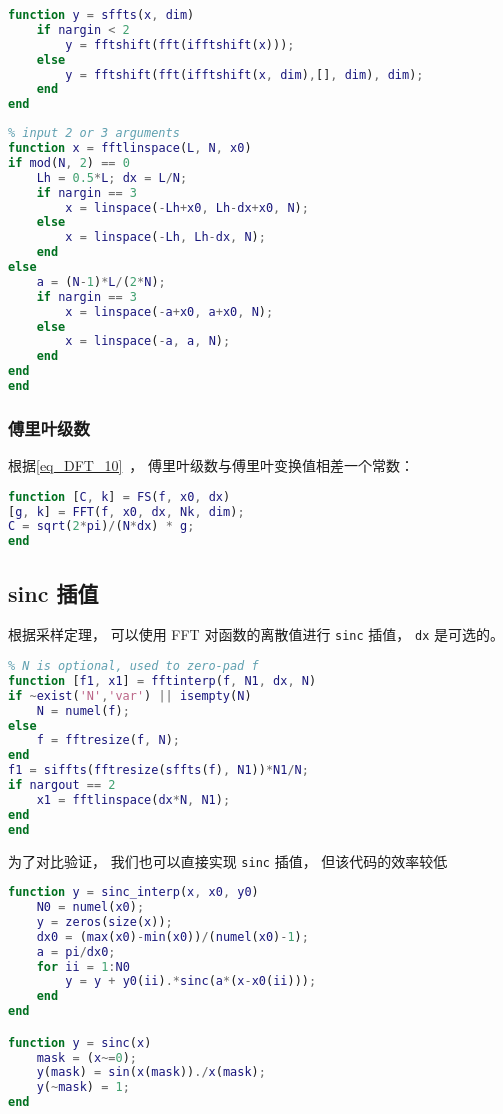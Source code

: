 \begin{lstlisting}[language=matlab, caption=sffts.m]
% shifted fft
function y = sffts(x, dim)
    if nargin < 2
        y = fftshift(fft(ifftshift(x)));
    else
        y = fftshift(fft(ifftshift(x, dim),[], dim), dim);
    end
end
\end{lstlisting}

\begin{lstlisting}[language=matlab, caption=fftlinspace.m]
% generate N grid points from bandwidth
% input 2 or 3 arguments
function x = fftlinspace(L, N, x0)
if mod(N, 2) == 0
    Lh = 0.5*L; dx = L/N;
    if nargin == 3
        x = linspace(-Lh+x0, Lh-dx+x0, N);
    else
        x = linspace(-Lh, Lh-dx, N);
    end
else
    a = (N-1)*L/(2*N);
    if nargin == 3
        x = linspace(-a+x0, a+x0, N);
    else
        x = linspace(-a, a, N);
    end
end
end
\end{lstlisting}

\subsubsection{傅里叶级数}
根据\autoref{eq_DFT_10}~， 傅里叶级数与傅里叶变换值相差一个常数：
\begin{lstlisting}[language=matlab, caption=FS.m]
% Fourier series by FFT
function [C, k] = FS(f, x0, dx)
[g, k] = FFT(f, x0, dx, Nk, dim);
C = sqrt(2*pi)/(N*dx) * g;
end
\end{lstlisting}

\subsection{sinc 插值}
根据采样定理， 可以使用 FFT 对函数的离散值进行 \verb|sinc| 插值， \verb|dx| 是可选的。
\begin{lstlisting}[language=matlab, caption=fftinterp.m]
% approximate sinc interpolation by fft
% N is optional, used to zero-pad f
function [f1, x1] = fftinterp(f, N1, dx, N)
if ~exist('N','var') || isempty(N)
    N = numel(f);
else
    f = fftresize(f, N);
end
f1 = siffts(fftresize(sffts(f), N1))*N1/N;
if nargout == 2
    x1 = fftlinspace(dx*N, N1);
end
end
\end{lstlisting}

为了对比验证， 我们也可以直接实现 \verb|sinc| 插值， 但该代码的效率较低
\begin{lstlisting}[language=matlab, caption=sinc\_interp.m]
% sinc_interp
function y = sinc_interp(x, x0, y0)
    N0 = numel(x0);
    y = zeros(size(x));
    dx0 = (max(x0)-min(x0))/(numel(x0)-1);
    a = pi/dx0;
    for ii = 1:N0
        y = y + y0(ii).*sinc(a*(x-x0(ii)));
    end
end

function y = sinc(x)
    mask = (x~=0);
    y(mask) = sin(x(mask))./x(mask);
    y(~mask) = 1;
end
\end{lstlisting}
